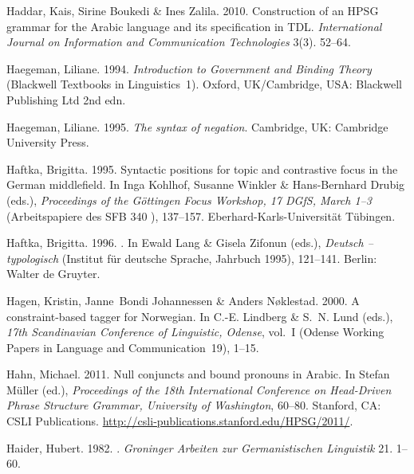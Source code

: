 \begin{thebibliography}{1420}
Haddar, Kais, Sirine Boukedi \& Ines Zalila. 2010.
\newblock Construction of an {HPSG} grammar for the {Arabic} language and its
  specification in {TDL}.
\newblock \emph{International Journal on Information and Communication
  Technologies} 3(3). 52--64.

Haegeman, Liliane. 1994.
\newblock \emph{Introduction to {Government and Binding Theory}} (Blackwell
  Textbooks in Linguistics~1).
\newblock Oxford, UK/Cambridge, USA: Blackwell Publishing Ltd 2nd edn.

Haegeman, Liliane. 1995.
\newblock \emph{The syntax of negation}.
\newblock Cambridge, UK: Cambridge University Press.

Haftka, Brigitta. 1995.
\newblock Syntactic positions for topic and contrastive focus in the {German}
  middlefield.
\newblock In Inga Kohlhof, Susanne Winkler \& Hans-Bernhard Drubig (eds.),
  \emph{Proceedings of the {G{\"o}ttingen Focus Workshop, 17 {DGfS}, March
  1--3}} (Arbeitspapiere des SFB 340 ), 137--157.
  Eberhard-Karls-Universit{\"a}t T{\"u}bingen.

Haftka, Brigitta. 1996.
.
\newblock In Ewald Lang \& Gisela Zifonun (eds.), \emph{Deutsch -- typologisch}
   (Institut f{\"u}r deutsche Sprache, Jahrbuch 1995), 121--141. Berlin: Walter
  de Gruyter.

Hagen, Kristin, Janne~Bondi Johannessen \& Anders N{\o}klestad. 2000.
\newblock A constraint-based tagger for {Norwegian}.
\newblock In C.-E. Lindberg \& S.~N. Lund (eds.), \emph{17th {Scandinavian
  Conference of Linguistic, Odense}}, vol.~I (Odense Working Papers in Language
  and Communication~19), 1--15.

Hahn, Michael. 2011.
\newblock Null conjuncts and bound pronouns in {Arabic}.
\newblock In Stefan M{\"u}ller (ed.), \emph{Proceedings of the {18th
  International Conference on Head-Driven Phrase Structure Grammar, University
  of Washington}}, 60--80. Stanford, CA: CSLI Publications.
\newblock \urlprefix\url{http://csli-publications.stanford.edu/HPSG/2011/}.

Haider, Hubert. 1982.
.
\newblock \emph{Groninger Arbeiten zur Germanistischen Linguistik} 21. 1--60.


\end{thebibliography}
